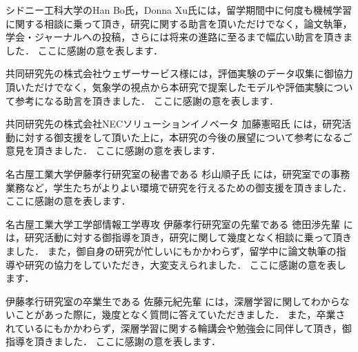 
シドニー工科大学のHan Bo氏，Donna Xu氏には，留学期間中に何度も機械学習に関する相談に乗って頂き，研究に関する助言を頂いただけでなく，論文執筆，学会・ジャーナルへの投稿，さらには将来の進路に至るまで幅広い助言を頂きました．
ここに感謝の意を表します． \par
\vspace{0.5cm}

共同研究先の株式会社ウェザーサービス様には，評価実験のデータ収集に御協力頂いただけでなく，気象学の視点から本研究で提案したモデルや評価実験について参考になる助言を頂きました．
ここに感謝の意を表します． \par
\vspace{0.5cm}

共同研究先の株式会社NECソリューションイノベータ 加藤憲昭氏 には，研究活動に対する御支援をして頂いた上に，本研究の今後の展望について参考になるご意見を頂きました．
ここに感謝の意を表します． \par
\vspace{0.5cm}

名古屋工業大学伊藤孝行研究室の秘書である 杉山順子氏 には，研究室での事務業務など，学生たちがよりよい環境で研究を行えるための御支援を頂きました．
ここに感謝の意を表します． \par
\vspace{0.5cm}

名古屋工業大学工学部情報工学専攻 伊藤孝行研究室の先輩である 徳田渉先輩 には，研究活動に対する御指導を頂き，研究に関して幾度となく相談に乗って頂きました．
また，御自身の研究が忙しいにもかかわらず，留学中に論文執筆の指導や研究の協力をしていただき，大変支えられました．
ここに感謝の意を表します． \par
\vspace{0.5cm}

伊藤孝行研究室の卒業生である 佐藤元紀先輩 には，深層学習に関してわからないことがあった際に，幾度となく質問に答えていただきました．
また，卒業されているにもかかわらず，深層学習に関する輪講会や勉強会に同伴して頂き，御指導を頂きました．
ここに感謝の意を表します． \par
\vspace{0.5cm}

